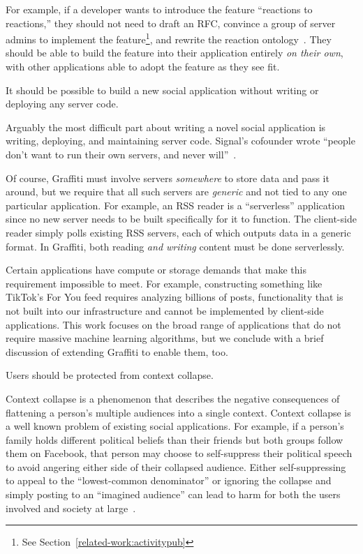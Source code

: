 For example, if a developer wants to introduce the feature
``reactions to reactions,'' they should not need to draft an RFC,
convince a group of server admins to implement the feature\footnote{
    See Section~\ref{related-work:activitypub}
},
and rewrite the reaction ontology~\cite{ecosystemmoving, herdingdnscamel, semanticwebtwodecades}.
They should be able to build the feature into their application
entirely \emph{on their own}, with other applications able to adopt the
feature as they see fit.

\begin{requirement}[Serverless]
\label{requirements:serverless}
    It should be possible to build a new social application without writing or deploying any server code.
\end{requirement}

Arguably the most difficult part about writing a novel
social application is writing, deploying,
and maintaining server code.
Signal's cofounder wrote
``people don’t want to run their own servers, and never will''~\cite{moxieweb3}.

Of course, Graffiti must involve servers \emph{somewhere} to store data
and pass it around, but we require that all such servers are \emph{generic}
and not tied to any one particular application.
For example, an RSS reader is a ``serverless'' application since
no new server needs to be built specifically for it to function.
The client-side reader simply polls existing RSS servers, each of which outputs data in a generic format.
In Graffiti, both reading \emph{and writing} content must be done serverlessly.

Certain applications have compute or storage demands that make this requirement impossible to meet.
For example, constructing something like TikTok's For You feed requires
analyzing billions of posts, functionality that is not built into our infrastructure and cannot be implemented by client-side applications.
This work focuses on the broad range of applications
that do not require massive machine learning algorithms,
but we conclude with a brief discussion of extending Graffiti to enable them, too.

\begin{requirement}
\label{requirements:context-differentiation}
    Users should be protected from context collapse.
\end{requirement}

Context collapse is a phenomenon that describes the negative consequences of flattening
a person's multiple audiences into a single context.
Context collapse is a well known problem of existing social applications.
For example, if a person's family holds different political beliefs than their friends
but both groups follow them on Facebook, that person may choose to self-suppress their political
speech to avoid angering either side of their collapsed audience.
Either self-suppressing to appeal to the ``lowest-common denominator'' or ignoring the collapse
and simply posting to an ``imagined audience'' can lead to harm for both
the users involved and society at large~\cite{contextcollapse, contextcollapseimpact, contextcollapsequeer, spiralofsilencesocialmedia}.

